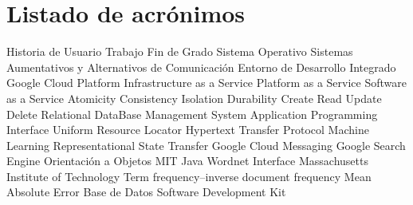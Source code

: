 \chapter{Listado de acrónimos}

{\small
\begin{acronym}[XXXXXXXX]
  		 {Historia de Usuario}	
   	 {Trabajo Fin de Grado}
  		 {Sistema Operativo}
      {Sistemas Aumentativos y Alternativos de Comunicación}
   	 {Entorno de Desarrollo Integrado}
   	 {Google Cloud Platform}
      {Infrastructure as a Service}
      {Platform as a Service}
  	 {Software as a Service}
   	 {Atomicity Consistency Isolation Durability}
  	 {Create Read Update Delete}
  	 {Relational DataBase Management System}
       {Application Programming Interface}
   	 {Uniform Resource Locator}
   	 {Hypertext Transfer Protocol}
  		 {Machine Learning}
  	 {Representational State Transfer}
  	 {Google Cloud Messaging}
       {Google Search Engine}
  		 {Orientación a Objetos}
   	 {MIT Java Wordnet Interface}
  	 {Massachusetts Institute of Technology}
  	 {Term frequency–inverse document frequency}
  	 {Mean Absolute Error} 
    	 {Base de Datos}
   	 {Software Development Kit}
\end{acronym}
}




